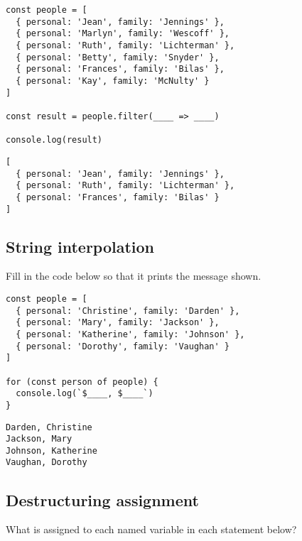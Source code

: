 \documentclass[krantzl]{krantz}
\begin{document}
\begin{lstlisting}[frame=tblr]
const people = [
  { personal: 'Jean', family: 'Jennings' },
  { personal: 'Marlyn', family: 'Wescoff' },
  { personal: 'Ruth', family: 'Lichterman' },
  { personal: 'Betty', family: 'Snyder' },
  { personal: 'Frances', family: 'Bilas' },
  { personal: 'Kay', family: 'McNulty' }
]

const result = people.filter(____ => ____)

console.log(result)
\end{lstlisting}



\begin{lstlisting}[frame=tblr,backgroundcolor=\color{black!5}]
[
  { personal: 'Jean', family: 'Jennings' },
  { personal: 'Ruth', family: 'Lichterman' },
  { personal: 'Frances', family: 'Bilas' }
]
\end{lstlisting}


\subsection*{String interpolation}


Fill in the code below so that it prints the message shown.


\begin{lstlisting}[frame=tblr]
const people = [
  { personal: 'Christine', family: 'Darden' },
  { personal: 'Mary', family: 'Jackson' },
  { personal: 'Katherine', family: 'Johnson' },
  { personal: 'Dorothy', family: 'Vaughan' }
]

for (const person of people) {
  console.log(`$____, $____`)
}
\end{lstlisting}



\begin{lstlisting}[frame=tblr,backgroundcolor=\color{black!5}]
Darden, Christine
Jackson, Mary
Johnson, Katherine
Vaughan, Dorothy
\end{lstlisting}


\subsection*{Destructuring assignment}


What is assigned to each named variable in each statement below?
\end{document}
